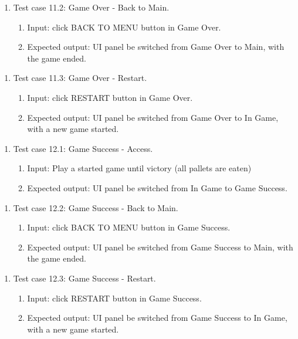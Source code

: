 \documentclass[11pt]{article}
\begin{document}
    \begin{enumerate}
        \item Test case 11.2: Game Over - Back to Main.
        \begin{enumerate}
            \item  Input: click BACK TO MENU button in Game Over.
            \item  Expected output: UI panel be switched from Game Over to Main, with the game ended.
        \end{enumerate}
    \end{enumerate}
    \begin{enumerate}
        \item Test case 11.3: Game Over - Restart.
        \begin{enumerate}
            \item  Input: click RESTART button in Game Over.
            \item  Expected output: UI panel be switched from Game Over to In Game, with a new game started.
        \end{enumerate}
    \end{enumerate}
    \begin{enumerate}
        \item Test case 12.1: Game Success - Access.
        \begin{enumerate}
            \item  Input: Play a started game until victory (all pallets are eaten)
            \item  Expected output: UI panel be switched from In Game to Game Success.
        \end{enumerate}
    \end{enumerate}
    \begin{enumerate}
        \item Test case 12.2: Game Success - Back to Main.
        \begin{enumerate}
            \item  Input: click BACK TO MENU button in Game Success.
            \item  Expected output: UI panel be switched from Game Success to Main, with the game ended.
        \end{enumerate}
    \end{enumerate}
    \begin{enumerate}
        \item Test case 12.3: Game Success - Restart.
        \begin{enumerate}
            \item  Input: click RESTART button in Game Success.
            \item  Expected output: UI panel be switched from Game Success to In Game, with a new game started.
        \end{enumerate}
    \end{enumerate}
\end{document}
